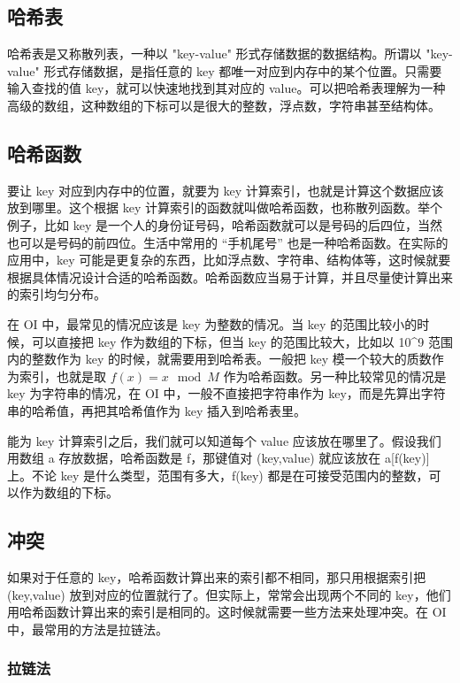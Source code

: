 
\subsection{哈希表}

哈希表是又称散列表，一种以 "key-value" 形式存储数据的数据结构。所谓以 "key-value" 形式存储数据，是指任意的 key 都唯一对应到内存中的某个位置。只需要输入查找的值 key，就可以快速地找到其对应的 value。可以把哈希表理解为一种高级的数组，这种数组的下标可以是很大的整数，浮点数，字符串甚至结构体。

\subsection{哈希函数}

要让 key 对应到内存中的位置，就要为 key 计算索引，也就是计算这个数据应该放到哪里。这个根据 key 计算索引的函数就叫做哈希函数，也称散列函数。举个例子，比如 key 是一个人的身份证号码，哈希函数就可以是号码的后四位，当然也可以是号码的前四位。生活中常用的 “手机尾号” 也是一种哈希函数。在实际的应用中，key 可能是更复杂的东西，比如浮点数、字符串、结构体等，这时候就要根据具体情况设计合适的哈希函数。哈希函数应当易于计算，并且尽量使计算出来的索引均匀分布。

在 OI 中，最常见的情况应该是 key 为整数的情况。当 key 的范围比较小的时候，可以直接把 key 作为数组的下标，但当 key 的范围比较大，比如以 10\textasciicircum{}9 范围内的整数作为 key 的时候，就需要用到哈希表。一般把 key 模一个较大的质数作为索引，也就是取 $f(x)=x \mod M$ 作为哈希函数。另一种比较常见的情况是 key 为字符串的情况，在 OI 中，一般不直接把字符串作为 key，而是先算出字符串的哈希值，再把其哈希值作为 key 插入到哈希表里。

能为 key 计算索引之后，我们就可以知道每个 value 应该放在哪里了。假设我们用数组 a 存放数据，哈希函数是 f，那键值对 (key,value) 就应该放在 a[f(key)] 上。不论 key 是什么类型，范围有多大，f(key) 都是在可接受范围内的整数，可以作为数组的下标。

\subsection{冲突}

如果对于任意的 key，哈希函数计算出来的索引都不相同，那只用根据索引把 (key,value) 放到对应的位置就行了。但实际上，常常会出现两个不同的 key，他们用哈希函数计算出来的索引是相同的。这时候就需要一些方法来处理冲突。在 OI 中，最常用的方法是拉链法。

\subsubsection{拉链法}

